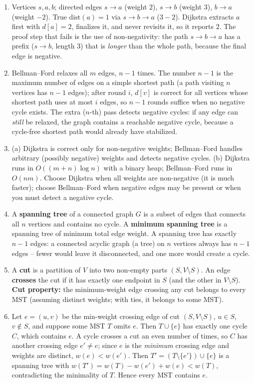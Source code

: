 \documentclass[11pt]{article}
\begin{document}
\begin{enumerate}[label=\textbf{A\arabic*.}, leftmargin=2.2em]
\item Vertices $s,a,b$; directed edges $s\to a$ (weight $2$), $s\to b$ (weight
$3$), $b\to a$ (weight $-2$). True $\mathrm{dist}(a)=1$ via $s\to b\to a$
($3-2$). Dijkstra extracts $a$ first with $d[a]=2$, finalizes it, and never
revisits it, so it reports $2$. The proof step that fails is the use of
non-negativity: the path $s\to b\to a$ has a prefix ($s\to b$, length $3$) that is
\emph{longer} than the whole path, because the final edge is negative.

\item Bellman--Ford relaxes all $m$ edges, $n-1$ times. The number $n-1$ is the
maximum number of edges on a simple shortest path (a path visiting $n$ vertices
has $n-1$ edges); after round $i$, $d[v]$ is correct for all vertices whose
shortest path uses at most $i$ edges, so $n-1$ rounds suffice when no negative
cycle exists. The extra ($n$-th) pass detects negative cycles: if any edge can
\emph{still} be relaxed, the graph contains a reachable negative cycle, because a
cycle-free shortest path would already have stabilized.

\item (a) Dijkstra is correct only for non-negative weights; Bellman--Ford
handles arbitrary (possibly negative) weights and detects negative cycles. (b)
Dijkstra runs in $O((m+n)\log n)$ with a binary heap; Bellman--Ford runs in
$O(nm)$. Choose Dijkstra when all weights are non-negative (it is much faster);
choose Bellman--Ford when negative edges may be present or when you must detect a
negative cycle.

\item A \textbf{spanning tree} of a connected graph $G$ is a subset of edges that
connects all $n$ vertices and contains no cycle. A \textbf{minimum spanning tree}
is a spanning tree of minimum total edge weight. A spanning tree has exactly
$n-1$ edges: a connected acyclic graph (a tree) on $n$ vertices always has
$n-1$ edges -- fewer would leave it disconnected, and one more would create a
cycle.

\item A \textbf{cut} is a partition of $V$ into two non-empty parts $(S, V
\setminus S)$. An edge \textbf{crosses} the cut if it has exactly one endpoint in
$S$ (and the other in $V\setminus S$). \textbf{Cut property:} the
minimum-weight edge crossing any cut belongs to every MST (assuming distinct
weights; with ties, it belongs to some MST).

\item Let $e=(u,v)$ be the min-weight crossing edge of cut $(S,V\setminus S)$,
$u\in S$, $v\notin S$, and suppose some MST $T$ omits $e$. Then $T\cup\{e\}$ has
exactly one cycle $C$, which contains $e$. A cycle crosses a cut an even number
of times, so $C$ has another crossing edge $e'\ne e$; since $e$ is the
\emph{minimum} crossing edge and weights are distinct, $w(e)<w(e')$. Then
$T'=(T\setminus\{e'\})\cup\{e\}$ is a spanning tree with $w(T')=w(T)-w(e')+w(e)
< w(T)$, contradicting the minimality of $T$. Hence every MST contains $e$.


\end{enumerate}
\end{document}

